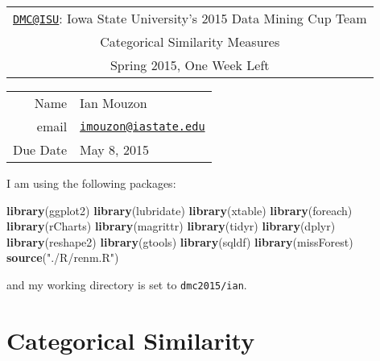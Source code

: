 \documentclass[10pt]{report}
\newenvironment{Shaded}{}{}
\newcommand{\KeywordTok}[1]{\textcolor[rgb]{0.00,0.44,0.13}{\textbf{{#1}}}}
\newcommand{\StringTok}[1]{\textcolor[rgb]{0.25,0.44,0.63}{{#1}}}
\newcommand{\NormalTok}[1]{{#1}}
\begin{document}
\thispagestyle{empty}%
\begin{center}%
    \renewcommand{\arraystretch}{1.5}%
    \begin{tabular}{c}%
       \Large{\href{mailto:DMC@ISU}{\nolinkurl{DMC@ISU}}: Iowa State University's 2015 Data Mining Cup Team}\\
       Categorical Similarity Measures\\
       Spring 2015, One Week Left \\
    \end{tabular}
\end{center}

\begin{center}
 \renewcommand{\arraystretch}{1.5}
 \begin{tabular*}{0.65\textwidth}{r@{:\hspace{.3cm}}l}
    \hline
     Name& Ian Mouzon\\
     email& \href{mailto:imouzon@iastate.edu}{\nolinkurl{imouzon@iastate.edu}}\\
    
    
     Due Date&  May 8, 2015\\
    \hline
 \end{tabular*}
\end{center}

I am using the following packages:

\begin{Shaded}
\begin{Highlighting}[]
   \KeywordTok{library}\NormalTok{(ggplot2)}
   \KeywordTok{library}\NormalTok{(lubridate)}
   \KeywordTok{library}\NormalTok{(xtable)}
   \KeywordTok{library}\NormalTok{(foreach)}
   \KeywordTok{library}\NormalTok{(rCharts)}
   \KeywordTok{library}\NormalTok{(magrittr)}
   \KeywordTok{library}\NormalTok{(tidyr)}
   \KeywordTok{library}\NormalTok{(dplyr)}
   \KeywordTok{library}\NormalTok{(reshape2)}
   \KeywordTok{library}\NormalTok{(gtools)}
   \KeywordTok{library}\NormalTok{(sqldf)}
   \KeywordTok{library}\NormalTok{(missForest)}
   \KeywordTok{source}\NormalTok{(}\StringTok{"./R/renm.R"}\NormalTok{)}
\end{Highlighting}
\end{Shaded}

and my working directory is set to \verb!dmc2015/ian!.

\section{Categorical Similarity}\label{categorical-similarity}
\end{document}
